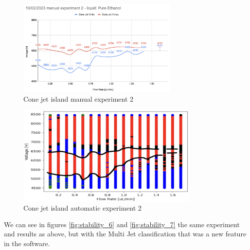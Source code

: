     \vspace{2cm}
    \begin{multicols}{2}


        \begin{figure}[H]
            \center
            \includegraphics[width=8cm]{Figuras/april/results_map_1.png}
            \caption{Cone jet island manual experiment 2}
            \label{fig:stability_4}
        \end{figure}

        \begin{figure}[H]
            \center
            \includegraphics[width=9cm]{Figuras/april/results_map_2.png}
            \caption{Cone jet island automatic experiment 2}
            \label{fig:stability_5}
        \end{figure}

    \end{multicols}

    We can see in figures \ref{fig:stability_6} and \ref{fig:stability_7} the same experiment and results as above, but with the Multi Jet classification that was a new feature in the software.

